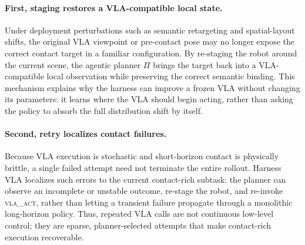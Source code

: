 \documentclass[11pt]{article}
\begin{document}
\paragraph{First, staging restores a VLA-compatible local state.}
Under deployment perturbations such as semantic retargeting and spatial-layout shifts, the original VLA viewpoint or pre-contact pose may no longer expose the correct contact target in a familiar configuration. By re-staging the robot around the current scene, the agentic planner $\Pi$ brings the target back into a VLA-compatible local observation while preserving the correct semantic binding. This mechanism explains why the harness can improve a frozen VLA without changing its parameters: it learns where the VLA should begin acting, rather than asking the policy to absorb the full distribution shift by itself.

\paragraph{Second, retry localizes contact failures.}
Because VLA execution is stochastic and short-horizon contact is physically brittle, a single failed attempt need not terminate the entire rollout. Harness VLA localizes such errors to the current contact-rich subtask: the planner can observe an incomplete or unstable outcome, re-stage the robot, and re-invoke \textsc{vla\_act}, rather than letting a transient failure propagate through a monolithic long-horizon policy. Thus, repeated VLA calls are not continuous low-level control; they are sparse, planner-selected attempts that make contact-rich execution recoverable.
\end{document}

